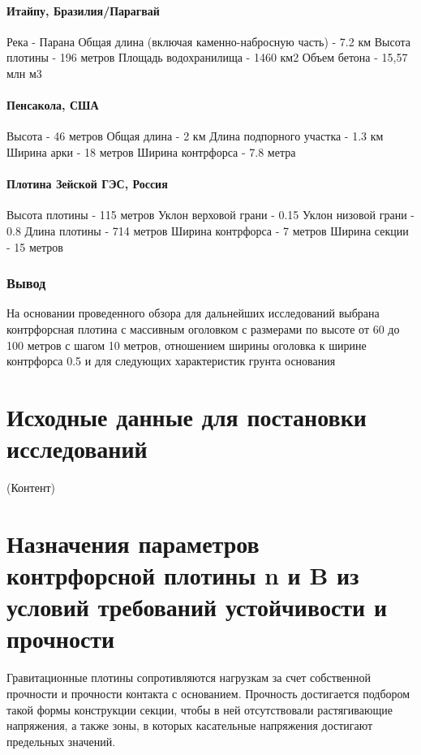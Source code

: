 \documentclass[12pt,a4paper,oneside,draft,titlepage]{article}
\begin{document}
\subsection{Итайпу, Бразилия/Парагвай}

Река - Парана
Общая длина (включая каменно-набросную часть) - 7.2 км
Высота плотины - 196 метров
Площадь водохранилища -  1460 км2
Объем бетона - 15,57 млн м3

\subsection{Пенсакола, США}

Высота - 46 метров
Общая длина - 2 км
Длина подпорного участка - 1.3 км
Ширина арки - 18 метров
Ширина контрфорса - 7.8 метра

\subsection{Плотина Зейской ГЭС, Россия}

Высота плотины - 115 метров
Уклон верховой грани - 0.15
Уклон низовой грани - 0.8
Длина плотины - 714 метров
Ширина контрфорса - 7 метров
Ширина секции - 15 метров


\section{Вывод}

На основании проведенного обзора для дальнейших исследований выбрана контрфорсная плотина с массивным оголовком с размерами по высоте от 60 до 100 метров с шагом 10 метров, отношением ширины оголовка к ширине контрфорса 0.5 и для следующих характеристик грунта основания

\part{Исходные данные для постановки исследований}

(Контент)

\part{Назначения параметров контрфорсной плотины n и B из условий требований устойчивости и прочности}

Гравитационные плотины сопротивляются нагрузкам за счет собственной прочности и прочности контакта с основанием. Прочность достигается подбором такой формы конструкции секции, чтобы в ней отсутствовали растягивающие напряжения, а также зоны, в которых касательные напряжения достигают предельных значений.
\end{document}
